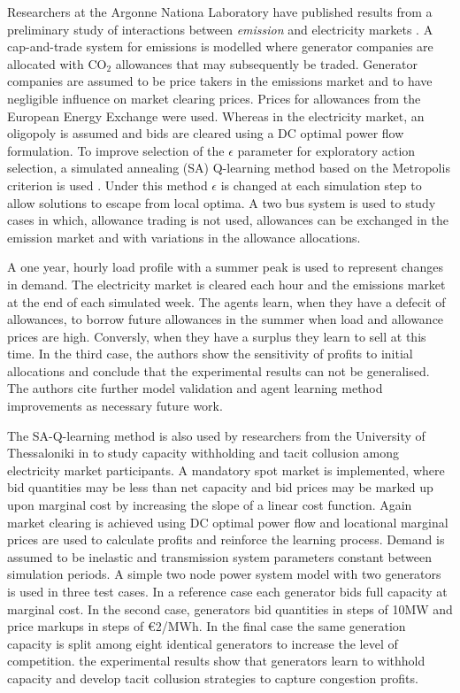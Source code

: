 Researchers at the Argonne Nationa Laboratory have published results from a
preliminary study of interactions between \textit{emission} and electricity
markets \cite{wang:09}.  A cap-and-trade system for emissions is modelled where
generator companies are allocated with $\mbox{CO}_2$ allowances that may
subsequently be traded.  Generator companies are assumed to be price takers in
the emissions market and to have negligible influence on market clearing
prices. Prices for allowances from the European Energy Exchange were used.
Whereas in the electricity market, an oligopoly is assumed and bids are cleared
using a DC optimal power flow formulation.  To improve selection of the
$\epsilon$ parameter for exploratory action selection, a simulated annealing
(SA) Q-learning method based on the Metropolis criterion is used \cite{guo:sa}.
Under this method $\epsilon$ is changed at each simulation step to allow
solutions to escape from local optima.  A two bus system is used to study cases
in which, allowance trading is not used, allowances can be exchanged in the
emission market and with variations in the allowance allocations.

A one year, hourly load profile with a summer peak is used to represent changes
in demand.  The electricity market is cleared each hour and the emissions market
at the end of each simulated week.  The agents learn, when they have a defecit
of allowances, to borrow future allowances in the summer when load and
allowance prices are high.  Conversly, when they have a surplus they learn to
sell at this time.  In the third case, the authors show the sensitivity of
profits to initial allocations and conclude that the experimental results can
not be generalised.  The authors cite further model validation and agent
learning method improvements as necessary future work.

The SA-Q-learning method is also used by researchers from the University of
Thessaloniki in \cite{tellidou:tacit} to study capacity withholding and tacit
collusion among electricity market participants.  A mandatory spot market is
implemented, where bid quantities may be less than net capacity and bid prices
may be marked up upon marginal cost by increasing the slope of a linear cost
function.  Again market clearing is achieved using DC optimal power flow and
locational marginal prices are used to calculate profits and reinforce the
learning process.  Demand is assumed to be inelastic and transmission
system parameters constant between simulation periods.  A simple two node
power system model with two generators is used in three test cases.  In a
reference case each generator bids full capacity at marginal cost.  In the
second case, generators bid quantities in steps of 10MW and price markups in
steps of \euro{2}/MWh.  In the final case the same generation capacity is
split among eight identical generators to increase the level of competition.  the
experimental results show that generators learn to withhold capacity and develop
tacit collusion strategies to capture congestion profits.

